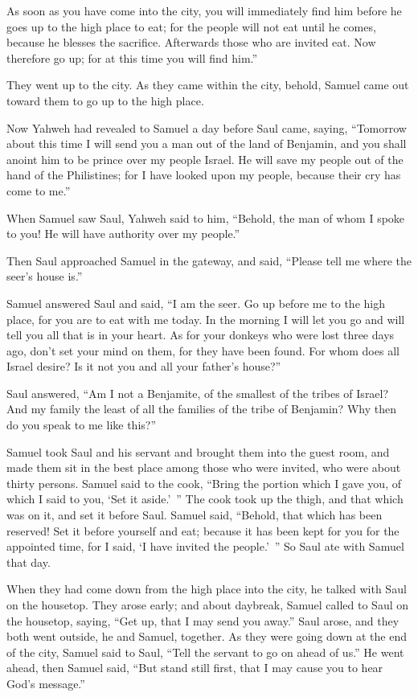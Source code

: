 {As soon as you have come into the city, you will immediately find him before he goes up to the high place to eat; for the people will not eat until he comes, because he blesses the sacrifice. Afterwards those who are invited eat. Now therefore go up; for at this time you will find him.”
\par }{\PP {}They went up to the city. As they came within the city, behold, Samuel came out toward them to go up to the high place.
\par }{\PP {}Now Yahweh had revealed to Samuel a day before Saul came, saying,
“Tomorrow about this time I will send you a man out of the land of Benjamin, and you shall anoint him to be prince over my people Israel. He will save my people out of the hand of the Philistines; for I have looked upon my people, because their cry has come to me.”
\par }{\PP {}When Samuel saw Saul, Yahweh said to him, “Behold, the man of whom I spoke to you! He will have authority over my people.”
\par }{\PP {}Then Saul approached Samuel in the gateway, and said, “Please tell me where the seer’s house is.”
\par }{\PP {}Samuel answered Saul and said, “I am the seer. Go up before me to the high place, for you are to eat with me today. In the morning I will let you go and will tell you all that is in your heart.
As for your donkeys who were lost three days ago, don’t set your mind on them, for they have been found. For whom does all Israel desire? Is it not you and all your father’s house?”
\par }{\PP {}Saul answered, “Am I not a Benjamite, of the smallest of the tribes of Israel? And my family the least of all the families of the tribe of Benjamin? Why then do you speak to me like this?”
\par }{\PP {}Samuel took Saul and his servant and brought them into the guest room, and made them sit in the best place among those who were invited, who were about thirty persons.
Samuel said to the cook, “Bring the portion which I gave you, of which I said to you, ‘Set it aside.’ ”
The cook took up the thigh, and that which was on it, and set it before Saul. Samuel said, “Behold, that which has been reserved! Set it before yourself and eat; because it has been kept for you for the appointed time, for I said, ‘I have invited the people.’ ” So Saul ate with Samuel that day.
\par }{\PP {}When they had come down from the high place into the city, he talked with Saul on the housetop.
They arose early; and about daybreak, Samuel called to Saul on the housetop, saying, “Get up, that I may send you away.” Saul arose, and they both went outside, he and Samuel, together.
As they were going down at the end of the city, Samuel said to Saul, “Tell the servant to go on ahead of us.” He went ahead, then Samuel said, “But stand still first, that I may cause you to hear God’s message.”

}

